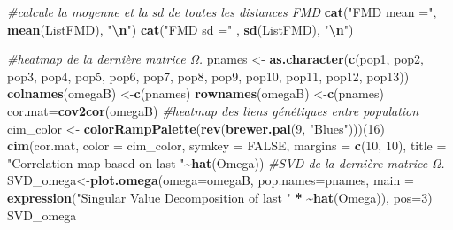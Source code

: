 \documentclass[
  openany]{book}
\newenvironment{Shaded}{\begin{snugshade}}{\end{snugshade}}
\newcommand{\AttributeTok}[1]{\textcolor[rgb]{0.13,0.29,0.53}{#1}}
\newcommand{\CommentTok}[1]{\textcolor[rgb]{0.56,0.35,0.01}{\textit{#1}}}
\newcommand{\ConstantTok}[1]{\textcolor[rgb]{0.56,0.35,0.01}{#1}}
\newcommand{\DecValTok}[1]{\textcolor[rgb]{0.00,0.00,0.81}{#1}}
\newcommand{\ErrorTok}[1]{\textcolor[rgb]{0.64,0.00,0.00}{\textbf{#1}}}
\newcommand{\FunctionTok}[1]{\textcolor[rgb]{0.13,0.29,0.53}{\textbf{#1}}}
\newcommand{\NormalTok}[1]{#1}
\newcommand{\OtherTok}[1]{\textcolor[rgb]{0.56,0.35,0.01}{#1}}
\newcommand{\SpecialCharTok}[1]{\textcolor[rgb]{0.81,0.36,0.00}{\textbf{#1}}}
\newcommand{\StringTok}[1]{\textcolor[rgb]{0.31,0.60,0.02}{#1}}
\theoremstyle{definition}
\theoremstyle{definition}
\theoremstyle{definition}
\theoremstyle{definition}
\theoremstyle{remark}
\begin{document}
\begin{Shaded}
\begin{Highlighting}[]
\CommentTok{\#calcule la moyenne et la sd de toutes les distances FMD}
\FunctionTok{cat}\NormalTok{(}\StringTok{"FMD mean ="}\NormalTok{, }\FunctionTok{mean}\NormalTok{(ListFMD), }\StringTok{"}\SpecialCharTok{\textbackslash{}n}\StringTok{"}\NormalTok{)}
\FunctionTok{cat}\NormalTok{(}\StringTok{"FMD sd ="}\NormalTok{ , }\FunctionTok{sd}\NormalTok{(ListFMD), }\StringTok{"}\SpecialCharTok{\textbackslash{}n}\StringTok{"}\NormalTok{)}

\CommentTok{\#heatmap de la dernière matrice Ω.}
\NormalTok{pnames }\OtherTok{\textless{}{-}} \FunctionTok{as.character}\NormalTok{(}\FunctionTok{c}\NormalTok{(}\StringTok{\textquotesingle{}pop1\textquotesingle{}}\NormalTok{, }\StringTok{\textquotesingle{}pop2\textquotesingle{}}\NormalTok{, }\StringTok{\textquotesingle{}pop3\textquotesingle{}}\NormalTok{, }\StringTok{\textquotesingle{}pop4\textquotesingle{}}\NormalTok{, }\StringTok{\textquotesingle{}pop5\textquotesingle{}}\NormalTok{, }\StringTok{\textquotesingle{}pop6\textquotesingle{}}\NormalTok{, }\StringTok{\textquotesingle{}pop7\textquotesingle{}}\NormalTok{, }\StringTok{\textquotesingle{}pop8\textquotesingle{}}\NormalTok{, }\StringTok{\textquotesingle{}pop9\textquotesingle{}}\NormalTok{, }\StringTok{\textquotesingle{}pop10\textquotesingle{}}\NormalTok{, }\StringTok{\textquotesingle{}pop11\textquotesingle{}}\NormalTok{, }\StringTok{\textquotesingle{}pop12\textquotesingle{}}\NormalTok{, }\StringTok{\textquotesingle{}pop13\textquotesingle{}}\NormalTok{))}
\FunctionTok{colnames}\NormalTok{(omegaB) }\OtherTok{\textless{}{-}}\FunctionTok{c}\NormalTok{(pnames)}
\FunctionTok{rownames}\NormalTok{(omegaB) }\OtherTok{\textless{}{-}}\FunctionTok{c}\NormalTok{(pnames)}
\NormalTok{cor.mat}\OtherTok{=}\FunctionTok{cov2cor}\NormalTok{(omegaB)}
\CommentTok{\#heatmap des liens génétiques entre population}
\NormalTok{cim\_color }\OtherTok{\textless{}{-}} \FunctionTok{colorRampPalette}\NormalTok{(}\FunctionTok{rev}\NormalTok{(}\FunctionTok{brewer.pal}\NormalTok{(}\DecValTok{9}\NormalTok{, }\StringTok{"Blues"}\NormalTok{)))(}\DecValTok{16}\NormalTok{)}
\FunctionTok{cim}\NormalTok{(cor.mat, }\AttributeTok{color =}\NormalTok{ cim\_color, }\AttributeTok{symkey =} \ConstantTok{FALSE}\NormalTok{, }\AttributeTok{margins =} \FunctionTok{c}\NormalTok{(}\DecValTok{10}\NormalTok{, }\DecValTok{10}\NormalTok{), }\AttributeTok{title =} \StringTok{"Correlation map based on last "}\SpecialCharTok{\textasciitilde{}}\FunctionTok{hat}\NormalTok{(Omega))}
\CommentTok{\#SVD de la dernière matrice Ω.}
\NormalTok{SVD\_omega}\OtherTok{\textless{}{-}}\FunctionTok{plot.omega}\NormalTok{(}\AttributeTok{omega=}\NormalTok{omegaB, }\AttributeTok{pop.names=}\NormalTok{pnames, }\AttributeTok{main =} \FunctionTok{expression}\NormalTok{(}\StringTok{"Singular Value Decomposition of last "} \SpecialCharTok{*} \ErrorTok{\textasciitilde{}}\FunctionTok{hat}\NormalTok{(Omega)), }\AttributeTok{pos=}\DecValTok{3}\NormalTok{)}
\NormalTok{SVD\_omega}
\end{Highlighting}
\end{Shaded}
\end{document}
